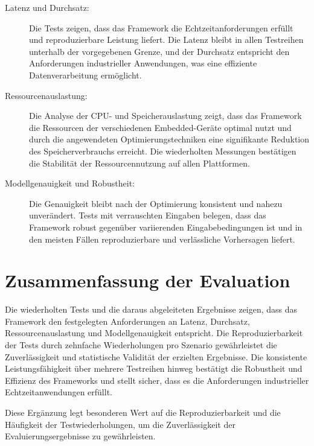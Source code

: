 \begin{description}
\item[Latenz und Durchsatz:] Die Tests zeigen, dass das Framework die Echtzeitanforderungen erfüllt und reproduzierbare Leistung liefert. Die Latenz bleibt in allen Testreihen unterhalb der vorgegebenen Grenze, und der Durchsatz entspricht den Anforderungen industrieller Anwendungen, was eine effiziente Datenverarbeitung ermöglicht.
\item[Ressourcenauslastung:] Die Analyse der CPU- und Speicherauslastung zeigt, dass das Framework die Ressourcen der verschiedenen Embedded-Geräte optimal nutzt und durch die angewendeten Optimierungstechniken eine signifikante Reduktion des Speicherverbrauchs erreicht. Die wiederholten Messungen bestätigen die Stabilität der Ressourcennutzung auf allen Plattformen.

\item[Modellgenauigkeit und Robustheit:] Die Genauigkeit bleibt nach der Optimierung konsistent und nahezu unverändert. Tests mit verrauschten Eingaben belegen, dass das Framework robust gegenüber variierenden Eingabebedingungen ist und in den meisten Fällen reproduzierbare und verlässliche Vorhersagen liefert.
\item[] \end{description}

\section{Zusammenfassung der Evaluation}

Die wiederholten Tests und die daraus abgeleiteten Ergebnisse zeigen, dass das Framework den festgelegten Anforderungen an Latenz, Durchsatz, Ressourcenauslastung und Modellgenauigkeit entspricht. Die Reproduzierbarkeit der Tests durch zehnfache Wiederholungen pro Szenario gewährleistet die Zuverlässigkeit und statistische Validität der erzielten Ergebnisse. Die konsistente Leistungsfähigkeit über mehrere Testreihen hinweg bestätigt die Robustheit und Effizienz des Frameworks und stellt sicher, dass es die Anforderungen industrieller Echtzeitanwendungen erfüllt.

Diese Ergänzung legt besonderen Wert auf die Reproduzierbarkeit und die Häufigkeit der Testwiederholungen, um die Zuverlässigkeit der Evaluierungsergebnisse zu gewährleisten.